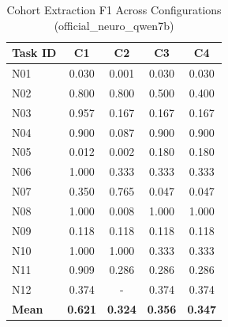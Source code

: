 \begin{table}[htbp]
\centering
\caption{Cohort Extraction F1 Across Configurations (official_neuro_qwen7b)}
\label{tab:official_neuro_qwen7b}
\begin{tabular}{lcccc}
\hline
\textbf{Task ID} & \textbf{C1} & \textbf{C2} & \textbf{C3} & \textbf{C4} \\
\hline
N01 & 0.030 & 0.001 & 0.030 & 0.030 \\
N02 & 0.800 & 0.800 & 0.500 & 0.400 \\
N03 & 0.957 & 0.167 & 0.167 & 0.167 \\
N04 & 0.900 & 0.087 & 0.900 & 0.900 \\
N05 & 0.012 & 0.002 & 0.180 & 0.180 \\
N06 & 1.000 & 0.333 & 0.333 & 0.333 \\
N07 & 0.350 & 0.765 & 0.047 & 0.047 \\
N08 & 1.000 & 0.008 & 1.000 & 1.000 \\
N09 & 0.118 & 0.118 & 0.118 & 0.118 \\
N10 & 1.000 & 1.000 & 0.333 & 0.333 \\
N11 & 0.909 & 0.286 & 0.286 & 0.286 \\
N12 & 0.374 & - & 0.374 & 0.374 \\
\hline
\textbf{Mean} & \textbf{0.621} & \textbf{0.324} & \textbf{0.356} & \textbf{0.347} \\
\hline
\end{tabular}
\end{table}